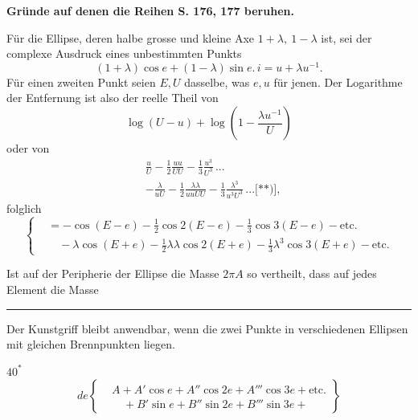 \begingroup
\makeatletter\tagsleft@true\let\veqno\@@leqno\makeatother
\clearpage{}
\noindent {\small[S. 222]}
\begin{center}\bfseries Gründe auf denen die Reihen S. 176, 177 beruhen.\end{center}
\par\indent Für die Ellipse, deren halbe grosse und kleine Axe $1+\lambda,\ 1-\lambda$ ist, sei der complexe Ausdruck eines unbestimmten Punkts
\begin{equation}
(1+\lambda)\cos e+(1-\lambda)\sin e.\,i=u+\lambda u^{-1}.\tag*{[8]}
\end{equation}
\noindent Für einen zweiten Punkt seien $E,U$ dasselbe, was $e,u$ für jenen. Der Logarithme der Entfernung ist also der reelle Theil von
\[
\log(U-u)+\log\left(1-\frac{\lambda u^{-1}}{U}\right)
\]
\noindent oder von
\[\begin{aligned}
&\frac uU-\frac12\frac{uu}{UU}-\frac13\frac{u^3}{U^3}\,{.}{.}{.}\\
&-\frac\lambda{uU}-\frac12\frac{\lambda\lambda}{uuUU}-\frac13\frac{\lambda^3}{u^3U^3}\,{.}{.}{.}\text{[**)]},
\end{aligned}\]
\noindent folglich
\begin{equation}
\left\{\begin{aligned}
&=-\cos(E-e)-\tfrac12\cos2(E-e)-\tfrac13\cos3(E-e)-\text{etc.}\\
&\quad-\lambda\cos(E+e)-\tfrac12\lambda\lambda\cos2(E+e)-\tfrac13\lambda^3\cos3(E+e)-\text{etc.}
\end{aligned}\right.\tag*{[9]}
\end{equation}
\par\indent Ist auf der Peripherie der Ellipse die Masse $2\pi A$ so vertheilt, dass auf jedes Element die Masse
\par\bigskip\noindent\rule{.25\linewidth}{.4pt}\par\smallskip
{\small\par\indent [**)] Der Kunstgriff bleibt anwendbar, wenn die zwei Punkte in verschiedenen Ellipsen mit gleichen Brennpunkten liegen.\par}
\par\medskip\noindent\hfill$40^{\ast}$
\clearpage{}
\begin{equation}
de\left\{\begin{aligned}
&A+A'\cos e+A''\cos2e+A'''\cos3e+\text{etc.}\\
&\quad+B'\sin e+B''\sin2e+B'''\sin3e+
\end{aligned}\right\}\tag*{[10]}
\end{equation}
